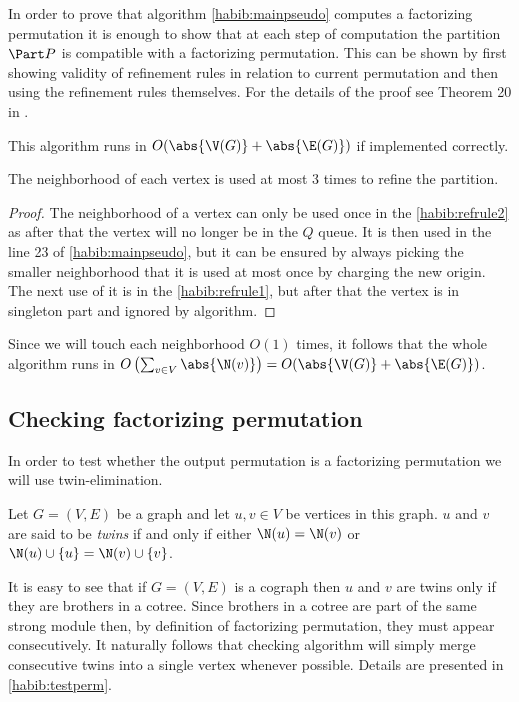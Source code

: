 In order to prove that algorithm \ref{habib:mainpseudo} computes a factorizing permutation it is enough to show that at each step of computation the partition $\Part P$ is compatible with a factorizing permutation. This can be shown by first showing validity of refinement rules in relation to current permutation and then using the refinement rules themselves. For the details of the proof see Theorem 20 in \cite{habib}.

This algorithm runs in $O(\abs{\V(G)} + \abs{\E(G)})$ if implemented correctly.

\begin{lemma}\label{habib:complexity}
    The neighborhood of each vertex is used at most 3 times to refine the partition.
\end{lemma}
\begin{proof}
    The neighborhood of a vertex can only be used once in the \ref{habib:refrule2} as after that the vertex will no longer be in the $Q$ queue. It is then used in the line 23 of \ref{habib:mainpseudo}, but it can be ensured by always picking the smaller neighborhood that it is used at most once by charging the new origin. The next use of it is in the \ref{habib:refrule1}, but after that the vertex is in singleton part and ignored by algorithm.
\end{proof}

Since we will touch each neighborhood $O(1)$ times, it follows that the whole algorithm runs in $O\left(\sum_{v\in V} \abs{\N(v)}\right) = O(\abs{\V(G)} + \abs{\E(G)})$.

\subsection{Checking factorizing permutation}

In order to test whether the output permutation is a factorizing permutation we will use twin-elimination.

\begin{defi}
    Let $G = (V,E)$ be a graph and let $u,v \in V$ be vertices in this graph. $u$ and $v$ are said to be \emph{twins} if and only if either $\N(u) = \N(v)$ or $\N(u)\cup\{u\} = \N(v)\cup\{v\}$.
\end{defi}

It is easy to see that if $G = (V,E)$ is a cograph then $u$ and $v$ are twins only if they are brothers in a cotree. Since brothers in a cotree are part of the same strong module then, by definition of factorizing permutation, they must appear consecutively. It naturally follows that checking algorithm will simply merge consecutive twins into a single vertex whenever possible. Details are presented in \ref{habib:testperm}.


